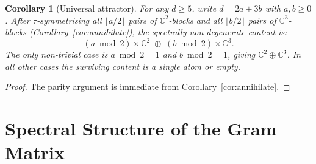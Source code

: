 \documentclass[12pt]{amsart}
\newtheorem{corollary}[theorem]{Corollary}
\theoremstyle{definition}
\theoremstyle{remark}
\newcommand{\CC}{\mathbb{C}}
\begin{document}
\begin{corollary}[Universal attractor]
\label{cor:attractor}
For any $d \ge 5$, write
$d = 2a + 3b$ with $a, b \ge 0$.
After $\tau$-symmetrising all
$\lfloor a/2 \rfloor$ pairs of $\CC^2$-blocks
and all $\lfloor b/2 \rfloor$ pairs of
$\CC^3$-blocks
(Corollary~\ref{cor:annihilate}),
the spectrally non-degenerate content is:
\begin{equation}
(a \bmod 2) \times \CC^2
\;\oplus\;
(b \bmod 2) \times \CC^3.
\end{equation}
The only non-trivial case is
$a \bmod 2 = 1$ and $b \bmod 2 = 1$,
giving $\CC^2 \oplus \CC^3$.
In all other cases the surviving content
is a single atom or empty.
\end{corollary}

\begin{proof}
The parity argument is immediate from
Corollary~\ref{cor:annihilate}.
\end{proof}

\section{Spectral Structure of the Gram Matrix}
\label{sec:spectrum}
\end{document}
